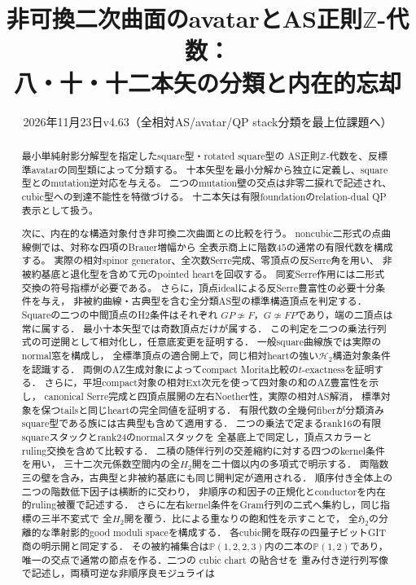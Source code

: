 \documentclass[a4paper,11pt]{ltjsarticle}
\title{非可換二次曲面のavatarとAS正則$\mathbb Z$-代数：\\
  八・十・十二本矢の分類と内在的忘却}
\author{}
\date{2026年11月23日\quad v4.63（全相対AS/avatar/QP stack分類を最上位課題へ）}
\numberwithin{equation}{section}
\theoremstyle{plain}
\theoremstyle{definition}
\theoremstyle{remark}
\newcommand{\HH}{\mathcal H_2}
\newcommand{\HHstack}{\mathfrak H_2}
\begin{document}
\maketitle
\begin{abstract}
最小単純射影分解型を指定したsquare型・rotated square型の
AS正則$\mathbb Z$-代数を、反標準avatarの同型類によって分類する。
十本矢型を最小分解から独立に定義し、square型とのmutation逆対応を与える。
二つのmutation壁の交点は非零二捩れで記述され、
cubic型への到達不能性を特徴づける。
十二本矢は有限foundationのrelation-dual QP表示として扱う。

次に、内在的な構造対象付き非可換二次曲面との比較を行う。
noncubic二形式の点曲線側では、対称な四項のBrauer増幅から
全表示商上に階数$45$の通常の有限代数を構成する。
実際の相対spinor generator、全次数Serre完成、零頂点の反Serre角を用い、
非被約基底と退化型を含めて元のpointed heartを回収する。
同変Serre作用には二形式交換の符号指標が必要である。
さらに，頂点idealによる反Serre豊富性の必要十分条件を与え，
非被約曲線・古典型を含む全分類AS型の標準構造頂点を判定する．
Squareの二つの中間頂点のH2条件はそれぞれ
$GP\not\simeq F$，$G\not\simeq FP$であり，端の二頂点は常に属する．
最小十本矢型では奇数頂点だけが属する．
この判定を二つの乗法行列式の可逆開として相対化し，任意底変更を証明する．
一般square曲線族では実際のnormal窓を構成し，
全標準頂点の適合開上で，同じ相対heartの強い$\HH$構造対象条件を認識する．
両側のAZ生成対象によってcompact Morita比較の$t$-exactnessを証明する．
さらに，平坦compact対象の相対Ext次元を使って四対象の和のAZ豊富性を示し，
canonical Serre完成と四頂点展開の左右Noether性，実際の相対AS解消，
標準対象を保つtailsと同じheartの完全同値を証明する．
有限代数の全幾何fiberが分類済みsquare型である族には古典型も含めて適用する．
二つの乗法で定まるrank16の有限squareスタックとrank24のnormalスタックを
全基底上で同定し，頂点スカラーとruling交換を含めて比較する．
二積の随伴行列の交差縮約に対する四つのkernel条件を用い，
三十二次元係数空間内の全$H_2$開を二十個以内の多項式で明示する．
両階数三の壁を含み，古典型と非被約基底にも同じ開判定が適用される．
順序付き全体上の二つの階数低下因子は横断的に交わり，
非順序の和因子の正規化とconductorを内在的ruling被覆で記述する．
さらに左右kernel条件をGram行列の二式へ集約し，同じ指標の三半不変式で
全$H_2$開を覆う．比による重なりの飽和性を示すことで，
全$\HHstack$の分離的な準射影的good moduli spaceを構成する．
各cubic開を既存の四量子ビットGIT商の明示開と同定する．
その被約補集合は$\mathbb P(1,2,2,3)$内の二本の$\mathbb P(1,2)$であり，
唯一の交点で通常の節点を作る．二つの cubic chart の貼合せを
重み付き逆行列写像で記述し，両積可逆な非順序良モジュライは

\end{abstract}
\end{document}
